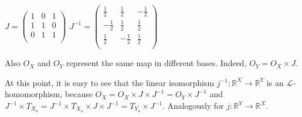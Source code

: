 \documentclass[3p]{elsarticle}
\newcommand{\cbox}[1]{\vspace{0.2cm}\noindent
  \fbox{\parbox{.97\textwidth}{#1}}\vspace{0.2cm}}
\newcommand{\fW}{\mathcal{W}}    %
\newcommand{\fL}{\mathcal{L}}    %
\newcommand{\matrixproduct}{\times} %
\newcommand{\K}{\mathbb{K}}            %
\newcommand{\wa}{{\sc wa}}             %
\newcommand{\lwa}{{\sc lwa}}           %
\newcommand{\reals}{{\mathbb{R}}}              %
\begin{document}
%
\begin{center}
$J=\left(%
\begin{array}{ccc}
  1 & 0 & 1 \\
  1 & 1 & 0 \\
  0 & 1 & 1 \\
\end{array}\right)$
\hspace{1cm}
$J^{-1}=\left(%
\begin{array}{ccc}
  \frac{1}{2} & \frac{1}{2} & -\frac{1}{2} \\
  -\frac{1}{2} & \frac{1}{2} & \frac{1}{2} \\
  \frac{1}{2} & -\frac{1}{2} & \frac{1}{2} \\
\end{array}\right)$
\end{center}
Also $O_X$ and $O_{Y}$ represent the same map in different bases.
Indeed,  $O_{Y} = O_X \matrixproduct J$.

At this point, it is easy to see that the linear isomorphism
$j^{-1}\colon \reals^X \to \reals^{Y}$ is an $\fL$-homomorphism, because
$O_{X}=O_{X}\matrixproduct J \matrixproduct J^{-1}= O_{Y}
\matrixproduct J^{-1}$ and $J^{-1} \matrixproduct T_{X_a} = J^{-1}
\matrixproduct T_{X_a}\matrixproduct J \matrixproduct J^{-1}=
T_{Y_a}\matrixproduct J^{-1}$. Analogously for $j\colon \reals^Y \to
\reals^{X}$.




%
\end{document}
